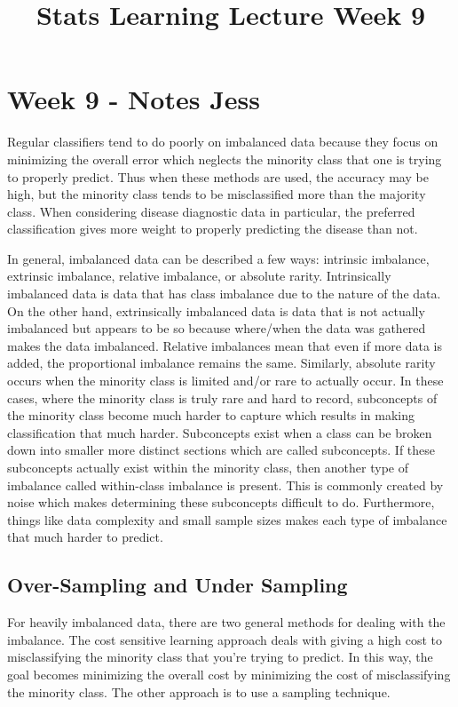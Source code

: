 \documentclass[a4paper]{article}
\title{Stats Learning Lecture Week 9}
\begin{document}
\section{Week 9 - Notes \textbf{Jess}}

	Regular classifiers tend to do poorly on imbalanced data because they focus on minimizing the overall error which neglects the minority class that one is trying to properly predict. Thus when these methods are used, the accuracy may be high, but the minority class tends to be misclassified more than the majority class. When considering disease diagnostic data in particular, the preferred classification gives more weight to properly predicting the disease than not.%

	In general, imbalanced data can be described a few ways: intrinsic imbalance, extrinsic imbalance, relative imbalance, or absolute rarity. Intrinsically imbalanced data is data that has class imbalance due to the nature of the data. On the other hand, extrinsically imbalanced data is data that is not actually imbalanced but appears to be so because where/when the data was gathered makes the data imbalanced. Relative imbalances mean that even if more data is added, the proportional imbalance remains the same. Similarly, absolute rarity occurs when the minority class is limited and/or rare to actually occur. In these cases, where the minority class is truly rare and hard to record, subconcepts of the minority class become much harder to capture which results in making classification that much harder. Subconcepts exist when a class can be broken down into smaller more distinct sections which are called subconcepts. If these subconcepts actually exist within the minority class, then another type of imbalance called within-class imbalance is present. This is commonly created by noise which makes determining these subconcepts difficult to do. Furthermore, things like data complexity and small sample sizes makes each type of imbalance that much harder to predict.%
    
    
\subsection{Over-Sampling and Under Sampling}
    For heavily imbalanced data, there are two general methods for dealing with the imbalance. The cost sensitive learning approach deals with giving a high cost to misclassifying the minority class that you’re trying to predict. In this way, the goal becomes minimizing the overall cost by minimizing the cost of misclassifying the minority class. The other approach is to use a sampling technique.%
\end{document}
